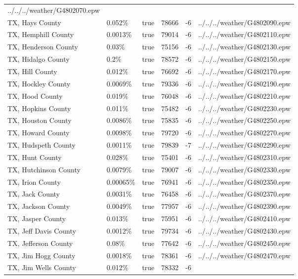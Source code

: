 \begin{longtable}[]{@{}llllll@{}}
../../../weather/G4802070.epw \\
TX, Hays County & 0.052\% & true & 78666 & -6 &
../../../weather/G4802090.epw \\
TX, Hemphill County & 0.0013\% & true & 79014 & -6 &
../../../weather/G4802110.epw \\
TX, Henderson County & 0.03\% & true & 75156 & -6 &
../../../weather/G4802130.epw \\
TX, Hidalgo County & 0.2\% & true & 78572 & -6 &
../../../weather/G4802150.epw \\
TX, Hill County & 0.012\% & true & 76692 & -6 &
../../../weather/G4802170.epw \\
TX, Hockley County & 0.0069\% & true & 79336 & -6 &
../../../weather/G4802190.epw \\
TX, Hood County & 0.019\% & true & 76048 & -6 &
../../../weather/G4802210.epw \\
TX, Hopkins County & 0.011\% & true & 75482 & -6 &
../../../weather/G4802230.epw \\
TX, Houston County & 0.0086\% & true & 75835 & -6 &
../../../weather/G4802250.epw \\
TX, Howard County & 0.0098\% & true & 79720 & -6 &
../../../weather/G4802270.epw \\
TX, Hudspeth County & 0.0011\% & true & 79839 & -7 &
../../../weather/G4802290.epw \\
TX, Hunt County & 0.028\% & true & 75401 & -6 &
../../../weather/G4802310.epw \\
TX, Hutchinson County & 0.0079\% & true & 79007 & -6 &
../../../weather/G4802330.epw \\
TX, Irion County & 0.00065\% & true & 76941 & -6 &
../../../weather/G4802350.epw \\
TX, Jack County & 0.0031\% & true & 76458 & -6 &
../../../weather/G4802370.epw \\
TX, Jackson County & 0.0049\% & true & 77957 & -6 &
../../../weather/G4802390.epw \\
TX, Jasper County & 0.013\% & true & 75951 & -6 &
../../../weather/G4802410.epw \\
TX, Jeff Davis County & 0.0012\% & true & 79734 & -6 &
../../../weather/G4802430.epw \\
TX, Jefferson County & 0.08\% & true & 77642 & -6 &
../../../weather/G4802450.epw \\
TX, Jim Hogg County & 0.0018\% & true & 78361 & -6 &
../../../weather/G4802470.epw \\
TX, Jim Wells County & 0.012\% & true & 78332 & -6 &

\end{longtable}

